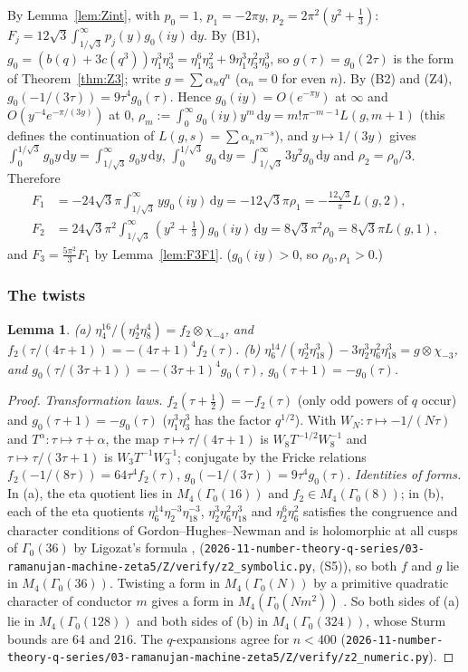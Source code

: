 \documentclass[11pt]{amsart}
\newtheorem{lemma}[theorem]{Lemma}
\theoremstyle{definition}
\theoremstyle{remark}
\numberwithin{equation}{section}
\newcommand{\dd}{\,\mathrm{d}}
\newcommand{\file}[1]{\nolinkurl{2026-11-number-theory-q-series/03-ramanujan-machine-zeta5/#1}}
\begin{document}
By Lemma~\ref{lem:Zint}, with $p_0=1$, $p_1=-2\pi y$, $p_2=2\pi^2(y^2+\frac13)$: $F_j=12\sqrt3\int_{1/\sqrt3}^\infty p_j(y)g_0(iy)\dd y$. By (B1), $g_0=(b(q)+3c(q^3))\eta_1^3\eta_3^3=\eta_1^6\eta_3^2+9\eta_1^3\eta_3^2\eta_9^3$, so $g(\tau)=g_0(2\tau)$ is the form of Theorem~\ref{thm:Z3}; write $g=\sum\alpha_nq^n$ ($\alpha_n=0$ for even $n$). By (B2) and (Z4), $g_0(-1/(3\tau))=9\tau^4g_0(\tau)$. Hence $g_0(iy)=O(e^{-\pi y})$ at $\infty$ and $O(y^{-4}e^{-\pi/(3y)})$ at $0$, $\rho_m:=\int_0^\infty g_0(iy)y^m\dd y=m!\pi^{-m-1}L(g,m+1)$ (this defines the continuation of $L(g,s)=\sum\alpha_nn^{-s}$), and $y\mapsto1/(3y)$ gives $\int_0^{1/\sqrt3}g_0y\dd y=\int_{1/\sqrt3}^\infty g_0y\dd y$, $\int_0^{1/\sqrt3}g_0\dd y=\int_{1/\sqrt3}^\infty3y^2g_0\dd y$ and $\rho_2=\rho_0/3$. Therefore
\begin{align*}
F_1&=-24\sqrt3\pi\int_{1/\sqrt3}^\infty yg_0(iy)\dd y=-12\sqrt3\pi\rho_1=-\frac{12\sqrt3}\pi L(g,2),\\ F_2&=24\sqrt3\pi^2\int_{1/\sqrt3}^\infty(y^2+\tfrac13)g_0(iy)\dd y=8\sqrt3\pi^2\rho_0=8\sqrt3\pi L(g,1),
\end{align*}
and $F_3=\frac{5\pi^2}3F_1$ by Lemma~\ref{lem:F3F1}. ($g_0(iy)>0$, so $\rho_0,\rho_1>0$.)

\subsubsection{The twists}
\begin{lemma}\label{lem:twistid}
\textup{(a)} $\eta_4^{16}/(\eta_2^4\eta_8^4)=f_2\otimes\chi_{-4}$, and $f_2(\tau/(4\tau+1))=-(4\tau+1)^4f_2(\tau)$.
\textup{(b)} $\eta_6^{14}/(\eta_2^3\eta_{18}^3)-3\eta_2^3\eta_6^2\eta_{18}^3=g\otimes\chi_{-3}$, and $g_0(\tau/(3\tau+1))=-(3\tau+1)^4g_0(\tau)$, $g_0(\tau+1)=-g_0(\tau)$.
\end{lemma}
\begin{proof}
\emph{Transformation laws.} $f_2(\tau+\frac12)=-f_2(\tau)$ (only odd powers of $q$ occur) and $g_0(\tau+1)=-g_0(\tau)$ ($\eta_1^3\eta_3^3$ has the factor $q^{1/2}$). With $W_N:\tau\mapsto-1/(N\tau)$ and $T^\alpha:\tau\mapsto\tau+\alpha$, the map $\tau\mapsto\tau/(4\tau+1)$ is $W_8T^{-1/2}W_8^{-1}$ and $\tau\mapsto\tau/(3\tau+1)$ is $W_3T^{-1}W_3^{-1}$; conjugate by the Fricke relations $f_2(-1/(8\tau))=64\tau^4f_2(\tau)$, $g_0(-1/(3\tau))=9\tau^4g_0(\tau)$.
\emph{Identities of forms.} In (a), the eta quotient lies in $M_4(\Gamma_0(16))$ and $f_2\in M_4(\Gamma_0(8))$; in (b), each of the eta quotients $\eta_6^{14}\eta_2^{-3}\eta_{18}^{-3}$, $\eta_2^3\eta_6^2\eta_{18}^3$ and $\eta_2^6\eta_6^2$ satisfies the congruence and character conditions of Gordon--Hughes--Newman \cite[Thm.~1.64]{Ono} and is holomorphic at all cusps of $\Gamma_0(36)$ by Ligozat's formula \cite{Lig}, \cite[Thm.~1.65]{Ono} (\file{Z/verify/z2_symbolic.py}, (S5)), so both $f$ and $g$ lie in $M_4(\Gamma_0(36))$. Twisting a form in $M_4(\Gamma_0(N))$ by a primitive quadratic character of conductor $m$ gives a form in $M_4(\Gamma_0(Nm^2))$ \cite[Prop.~3.64]{Shi}. So both sides of (a) lie in $M_4(\Gamma_0(128))$ and both sides of (b) in $M_4(\Gamma_0(324))$, whose Sturm bounds \cite{Stu} are $64$ and $216$. The $q$-expansions agree for $n<400$ (\file{Z/verify/z2_numeric.py}).
\end{proof}
\end{document}

